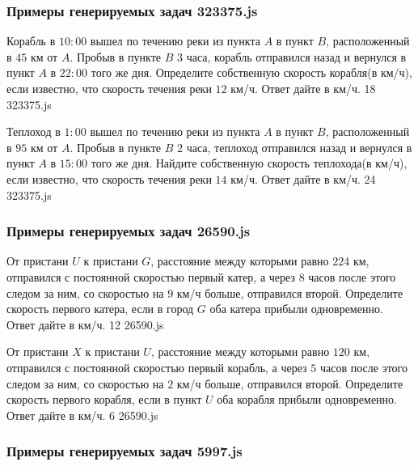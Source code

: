 
\subsubsection*{Примеры генерируемых задач 323375.js}   

\par{Корабль в $10:00$ вышел по течению реки из пункта $A$ в пункт $B$, расположенный в $45$ км от $A$. Пробыв в пункте $B$ $3$ часа, корабль отправился назад и вернулся в пункт $A$ в $22:00$ того же дня. Определите собственную скорость корабля(в км/ч), если известно, что скорость течения реки $12$ км/ч. Ответ дайте в км/ч. }{ 18 }{323375.js}
\par{Теплоход в $1:00$ вышел по течению реки из пункта $A$ в пункт $B$, расположенный в $95$ км от $A$. Пробыв в пункте $B$ $2$ часа, теплоход отправился назад и вернулся в пункт $A$ в $15:00$ того же дня. Найдите собственную скорость теплохода(в км/ч), если известно, что скорость течения реки $14$ км/ч. Ответ дайте в км/ч. }{ 24 }{323375.js}


\subsubsection*{Примеры генерируемых задач 26590.js}   

\par{От пристани $U$ к пристани $G$, расстояние между которыми равно $224$ км, отправился с постоянной скоростью первый катер, а через $8$ часов после этого следом за ним, со скоростью на $9$ км/ч больше, отправился второй. Определите скорость первого катера, если в город $G$ оба катера прибыли одновременно. Ответ дайте в км/ч. }{ 12 }{26590.js}
\par{От пристани $X$ к пристани $U$, расстояние между которыми равно $120$ км, отправился с постоянной скоростью первый корабль, а через $5$ часов после этого следом за ним, со скоростью на $2$ км/ч больше, отправился второй. Определите скорость первого корабля, если в пункт $U$ оба корабля прибыли одновременно. Ответ дайте в км/ч. }{ 6 }{26590.js}


\subsubsection*{Примеры генерируемых задач 5997.js}   

